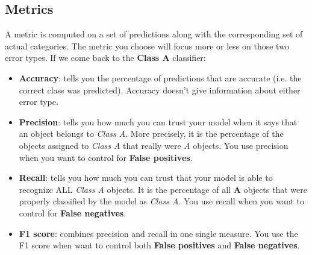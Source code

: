 \subsection*{Metrics}
A metric is computed on a set of predictions along with the corresponding set of actual categories.
The metric you choose will focus more or less on those two error types.
If we come back to the \textbf{Class A} classifier:
\begin{itemize}
    \item \textbf{Accuracy}: tells you the percentage of predictions that are accurate (i.e. the correct class was predicted).
          Accuracy doesn't give information about either error type.
    \item \textbf{Precision}: tells you how much you can trust your model when it says that an object belongs to \textit{Class A}.
          More precisely, it is the percentage of the objects assigned to \textit{Class A} that really were \textit{A} objects.
          You use precision when you want to control for \textbf{False positives}.
    \item \textbf{Recall}: tells you how much you can trust that your model is able to recognize ALL \textit{Class A} objects.
          It is the percentage of all \textbf{A} objects that were properly classified by the model as \textit{Class A}.
          You use recall when you want to control for \textbf{False negatives}.
    \item \textbf{F1 score}: combines precision and recall in one single measure.
          You use the F1 score when want to control both \textbf{False positives} and \textbf{False negatives}.
\end{itemize}
